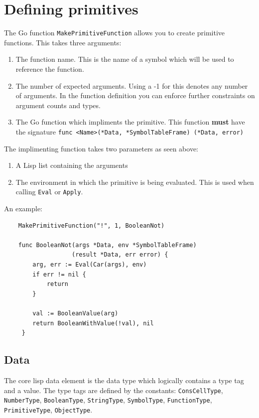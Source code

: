 \documentclass[12pt]{article}
\begin{document}
\section{Defining primitives}

The Go function \verb|MakePrimitiveFunction| allows you to create
primitive functions. This takes three arguments:

\begin{enumerate}
\item The function name. This is the name of a symbol which will be
  used to reference the function.
\item The number of expected arguments. Using a -1 for this denotes
  any number of arguments. In the function definition you can enforce
  further constraints on argument counts and types.
\item The Go function which impliments the primitive. This function
  {\bf must} have the signature
  \verb|func <Name>(*Data, *SymbolTableFrame) (*Data, error)|
\end{enumerate}

\noindent The implimenting function takes two parameters as seen
above:

\begin{enumerate}
\item A Lisp list containing the arguments
\item The environment in which the primitive
  is being evaluated. This is used when calling \verb|Eval| or \verb|Apply|.
\end{enumerate}

\noindent An example:

\begin{verbatim}
    MakePrimitiveFunction("!", 1, BooleanNot)

    func BooleanNot(args *Data, env *SymbolTableFrame)
                   (result *Data, err error) {
        arg, err := Eval(Car(args), env)
        if err != nil {
            return
        }

        val := BooleanValue(arg)
        return BooleanWithValue(!val), nil
     }
\end{verbatim}

\subsection{Data}

The core lisp data element is the data type which logically
contains a type tag and a value. The type tags are defined by the
constants: \verb|ConsCellType|, \verb|NumberType|, \verb|BooleanType|,
\verb|StringType|, \verb|SymbolType|, \verb|FunctionType|,
\verb|PrimitiveType|, \verb|ObjectType|.
\end{document}
